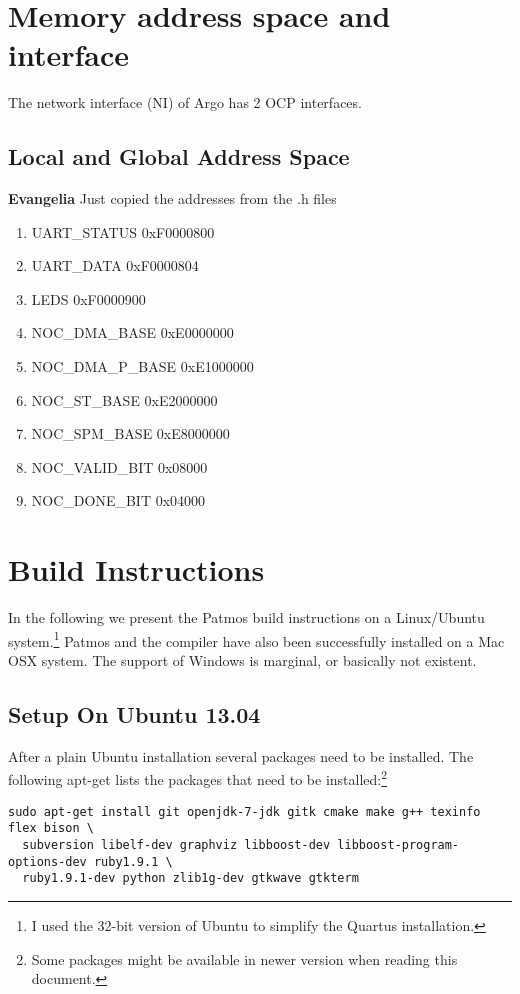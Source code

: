 \documentclass[a4paper,fontsize=10pt,twoside,DIV15,BCOR12mm,headinclude=true,footinclude=false,pagesize,bibtotoc]{scrbook}
\newcommand{\comment}[3]{

\textsf{\textbf{#1}} {\color{#3}#2}}
\newcommand{\eva}[1]{\comment{Evangelia}{#1}{Green}}
\begin{document}
\chapter{Memory address space and interface}
The network interface (NI) of Argo has 2 OCP\cite{ocp:spec} interfaces.


\section{Local and Global Address Space}

\eva{Just copied the addresses from the .h files}
\begin{enumerate}
\item UART\_STATUS	0xF0000800
\item UART\_DATA	0xF0000804
\item LEDS   		0xF0000900

\item NOC\_DMA\_BASE	0xE0000000
\item NOC\_DMA\_P\_BASE	0xE1000000
\item NOC\_ST\_BASE	0xE2000000
\item NOC\_SPM\_BASE	0xE8000000
\item NOC\_VALID\_BIT	0x08000
\item NOC\_DONE\_BIT	0x04000
\end{enumerate}



\chapter{Build Instructions}

In the following we present the Patmos build instructions on a Linux/Ubuntu
system.\footnote{I used the 32-bit version of Ubuntu to simplify the Quartus installation.}
Patmos and the compiler have also been successfully installed on a Mac OSX
system. The support of Windows is marginal, or basically not existent.


\section{Setup On Ubuntu 13.04}

After a plain Ubuntu installation several packages need to be installed.
The following apt-get lists the packages that need to be
installed:\footnote{Some packages might be available in newer version
when reading this document.}

\begin{verbatim}
sudo apt-get install git openjdk-7-jdk gitk cmake make g++ texinfo flex bison \
  subversion libelf-dev graphviz libboost-dev libboost-program-options-dev ruby1.9.1 \
  ruby1.9.1-dev python zlib1g-dev gtkwave gtkterm
\end{verbatim}
\end{document}
